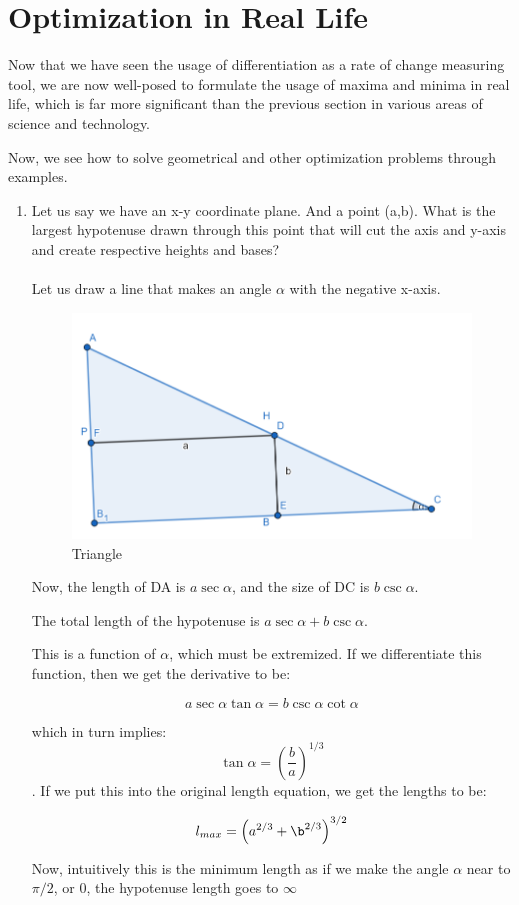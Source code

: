 \section{Optimization in Real Life}

Now that we have seen the usage of differentiation as a rate of change measuring tool, we are now well-posed to formulate the usage of maxima and minima in real life, which is far more significant than the previous section in various areas of science and technology.

Now, we see how to solve geometrical and other optimization problems through examples.

\begin{enumerate}
    \item Let us say we have an x-y coordinate plane. And a point (a,b). What is the largest hypotenuse drawn through this point that will cut the axis and y-axis and create respective heights and bases?\\\\
        Let us draw a line that makes an angle $\alpha$ with the negative x-axis. 

        \begin{figure}[\ht]
            \centering
            \includegraphics[width=0.5\linewidth]{sections_Calculus/Differentiation in Real Life/Opt_1.png}
            \caption{Triangle}
            \label{fig:enter-label}
        \end{figure}


        Now, the length of DA is $a\sec\alpha$, and the size of DC is $b\csc\alpha$.

        The total length of the hypotenuse is $a\sec\alpha+ b \csc\alpha$.

        This is a function of $\alpha$, which must be extremized. If we differentiate this function, then we get the derivative to be:

        $$a\sec\alpha \tan\alpha = b \csc\alpha \cot\alpha $$

        which in turn implies: $$\tan\alpha = \left( \frac{b}{a}\right)^{1/3}$$. If we put this into the original length equation, we get the lengths to be:

        $$l_{max}=\left(a^{2/3} + \b ^{2/3}\right)^{3/2}$$

        Now, intuitively this is the minimum length as if we make the angle $\alpha$ near to $\pi/2 $, or 0, the hypotenuse length goes to $\infty$
\end{enumerate}

